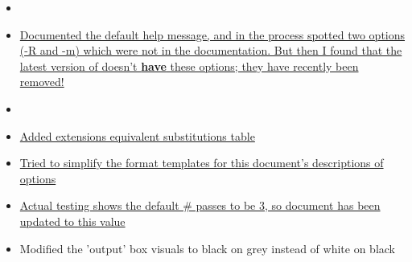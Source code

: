 \begin{itemize}
\item[]
\item \hyperref[changelog:20200831help]{Documented the default \dasm help message, and in the process spotted two options (-R and -m) which were not in the documentation. But then I found that the latest version of \dasm doesn't \textbf{have} these options; they have recently been removed!}
\item[]
\item \hyperref[changelog:20200829substitutions]{Added extensions equivalent substitutions table}
\item \hyperref[changelog:20200829formatdescription]{Tried to simplify the format templates for this document's descriptions of options}
\item \hyperref[changelog:20200824passes]{Actual testing shows the default \# passes to be 3, so document has been updated to this value}
\item Modified the 'output' box visuals to black on grey instead of white on black


\end{itemize}
